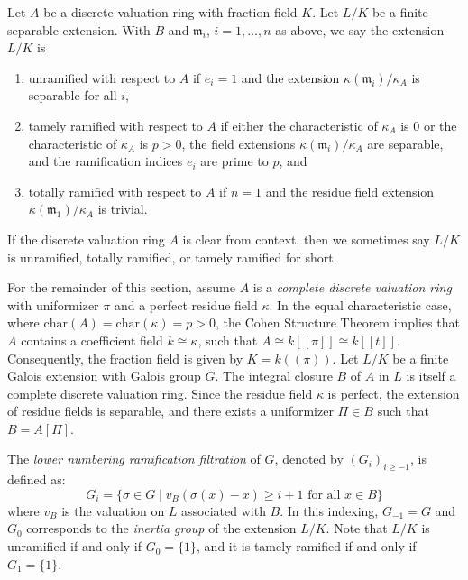 \begin{definition}[\stackstag{09E9}]\label{definition:tamely_ramified_dvrs}
Let $A$ be a discrete valuation ring with fraction field $K$. Let $L/K$ be a finite separable extension. With $B$ and $\mathfrak m_ i$, $i = 1, \ldots , n$
as above, we say the extension $L/K$ is
\begin{enumerate}
    \item unramified with respect to $A$ if $e_ i = 1$ and the extension $\kappa (\mathfrak m_ i)/\kappa _ A$ is separable for all $i$,
    \item tamely ramified with respect to $A$ if either the characteristic of $\kappa _ A$ is $0$ or the characteristic of $\kappa _ A$ is $p > 0$, the field extensions $\kappa (\mathfrak m_ i)/\kappa _ A$ are separable, and the ramification indices $e_ i$ are prime to $p$, and
    \item totally ramified with respect to $A$ if $n = 1$ and the residue field extension $\kappa (\mathfrak m_1)/\kappa _ A$ is trivial.
\end{enumerate}
If the discrete valuation ring $A$ is clear from context, then we sometimes say $L/K$ is unramified, totally ramified, or tamely ramified for short.
\end{definition}

For the remainder of this section, assume $A$ is a \textit{complete discrete valuation ring} with uniformizer $\pi$ and a perfect residue
field $\kappa$. In the equal characteristic case, where $\text{char}(A) = \text{char}(\kappa) = p > 0$, the
Cohen Structure Theorem implies that $A$ contains a coefficient field $k \cong \kappa$, such that $A \cong k[[\pi]] \cong k[[t]]$.
Consequently, the fraction field is given by $K = k((\pi))$.
Let $L/K$ be a finite Galois extension with Galois group $G$.
The integral closure $B$ of $A$ in $L$ is itself a complete discrete valuation ring.
Since the residue field $\kappa$ is perfect, the extension of residue fields is separable, and there exists a uniformizer
$\Pi \in B$ such that $B = A[\Pi]$.

The \textit{lower numbering ramification filtration} of $G$, denoted by $(G_i)_{i \geq -1}$, is defined as:
\[
G_i = \{ \sigma \in G \mid v_B(\sigma (x) - x) \geq i + 1 \text{ for all } x \in B \}
\]
where $v_B$ is the valuation on $L$ associated with $B$. In this indexing, $G_{-1} = G$ and $G_0$
corresponds to the \textit{inertia group} of the extension $L/K$. Note that $L/K$ is unramified if and only if
$G_0 = \{1\}$, and it is tamely ramified if and only if $G_1 = \{1\}$.

